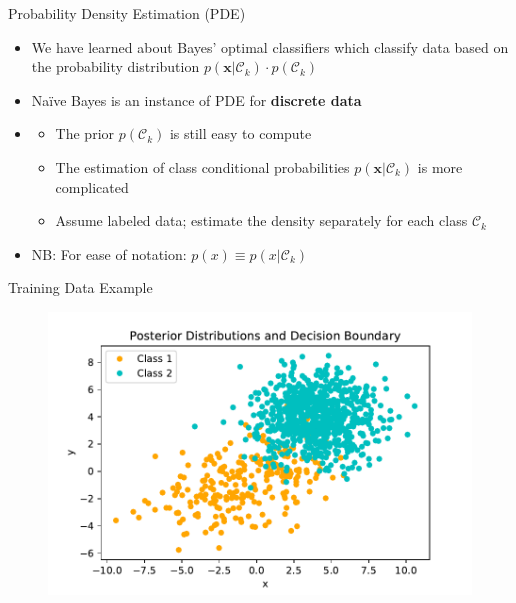 \begin{frame}{Probability Density Estimation (PDE)}{}
	\begin{itemize}
		\item We have learned about Bayes' optimal classifiers which classify data based on the probability distribution
			$p(\bm{x} \vert \mathcal{C}_k) \cdot p(\mathcal{C}_k)$
		\item Na\"{i}ve Bayes is an instance of PDE for \textbf{discrete data}
		\item {}
		\begin{itemize}
			\item The prior $p({\mathcal{C}_k})$ is still easy to compute
			\item The estimation of class conditional probabilities $p(\bm{x} \vert \mathcal{C}_k)$ is more complicated
			\item Assume labeled data; estimate the density separately for each class $\mathcal{C}_k$
		\end{itemize}
		\item NB: For ease of notation: $p(x) \equiv p(x \vert \mathcal{C}_k)$
	\end{itemize}
\end{frame}


\begin{frame}{Training Data Example}{}
	\begin{figure}
		\centering
		\includegraphics[scale=0.55]{04_density_estimation/02_img/pde_data_raw}
	\end{figure}
\end{frame}


